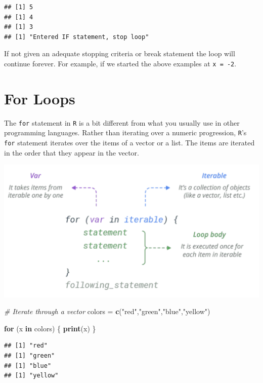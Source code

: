 \documentclass[
]{book}
\newenvironment{Shaded}{\begin{snugshade}}{\end{snugshade}}
\newcommand{\CommentTok}[1]{\textcolor[rgb]{0.56,0.35,0.01}{\textit{#1}}}
\newcommand{\ControlFlowTok}[1]{\textcolor[rgb]{0.13,0.29,0.53}{\textbf{#1}}}
\newcommand{\KeywordTok}[1]{\textcolor[rgb]{0.13,0.29,0.53}{\textbf{#1}}}
\newcommand{\NormalTok}[1]{#1}
\newcommand{\StringTok}[1]{\textcolor[rgb]{0.31,0.60,0.02}{#1}}
\begin{document}
\begin{verbatim}
## [1] 5
## [1] 4
## [1] 3
## [1] "Entered IF statement, stop loop"
\end{verbatim}

If not given an adequate stopping criteria or break statement the loop will continue forever. For example, if we started the above examples at \texttt{x\ =\ -2}.

\hypertarget{for-loops}{%
\section{For Loops}\label{for-loops}}

The \texttt{for} statement in \texttt{R} is a bit different from what you usually use in other programming languages. Rather than iterating over a numeric progression, \texttt{R}'s \texttt{for} statement iterates over the items of a vector or a list. The items are iterated in the order that they appear in the vector.

\includegraphics[width=16.11in]{images/ForLoop}

\begin{Shaded}
\begin{Highlighting}[]
\CommentTok{# Iterate through a vector}
\NormalTok{colors =}\StringTok{ }\KeywordTok{c}\NormalTok{(}\StringTok{"red"}\NormalTok{,}\StringTok{"green"}\NormalTok{,}\StringTok{"blue"}\NormalTok{,}\StringTok{"yellow"}\NormalTok{)}

\ControlFlowTok{for}\NormalTok{ (x }\ControlFlowTok{in}\NormalTok{ colors) \{}
  \KeywordTok{print}\NormalTok{(x)}
\NormalTok{\}}
\end{Highlighting}
\end{Shaded}

\begin{verbatim}
## [1] "red"
## [1] "green"
## [1] "blue"
## [1] "yellow"
\end{verbatim}
\end{document}
